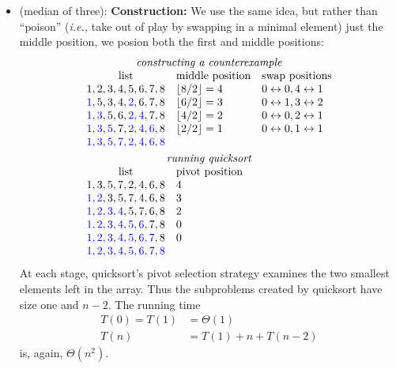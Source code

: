 \documentclass[a4paper]{article}
\newcommand*{\floor}[1]{\left\lfloor{#1}\right\rfloor}
\newcommand{\ie}{\emph{i.e.,} }
\begin{document}
\begin{itemize}
\begin{enumerate}
	\end{enumerate}

	\item
	(median of three):
	\textbf{Construction:}
	We use the same idea, but rather than ``poison'' (\ie take out of play by swapping in a minimal element) just the middle position, we posion both the first and middle positions:
	\[
		\begin{array}{cll}
		\multicolumn{3}{c}{\text{\emph{constructing a counterexample}}} \\
		\text{list} & \text{middle position} & \text{swap positions} \\
		1, 2, 3, 4, 5, 6, 7, 8	&\floor{8/2} = 4 & 0 \SWAP 0, 4 \SWAP 1 \\
		\USED{1}, 5, 3, 4, \USED{2}, 6, 7, 8 & \floor{6/2} = 3 & 0 \SWAP 1, 3 \SWAP 2 \\
		\USED{1, 3}, 5, 6, \USED{2, 4}, 7, 8 & \floor{4/2} = 2 & 0 \SWAP 0, 2 \SWAP 1 \\
		\USED{1, 3, 5}, 7, \USED{2, 4, 6}, 8 & \floor{2/2} = 1 & 0 \SWAP 0, 1 \SWAP 1 \\
		\USED{1, 3, 5, 7, 2, 4, 6, 8} \\[\jot]
		\multicolumn{3}{c}{\text{\emph{running quicksort}}} \\
		\text{list} & \text{pivot position} \\
		1, 3, 5, 7, 2, 4, 6, 8	& 4 \\
		\USED{1, 2}, 3, 5, 7, 4, 6, 8 & 3 \\
		\USED{1, 2, 3, 4}, 5, 7, 6, 8 & 2 \\
		\USED{1, 2, 3, 4, 5, 6}, 7, 8 & 0 \\
		\USED{1, 2, 3, 4, 5, 6, 7}, 8 & 0 \\
		\USED{1, 2, 3, 4, 5, 6, 7, 8}
		\end{array}
	\]
	At each stage, quicksort's pivot selection strategy examines the two smallest elements left in the array.
	Thus the subproblems created by quicksort have size one and $n - 2$.
	The running time
	\begin{align*}
		T(0) = T(1) &= \Theta(1) \\
		T(n) &= T(1) + n + T(n-2)
	\end{align*}
	is, again, $\Theta(n^2)$.


\end{itemize}
\end{document}
